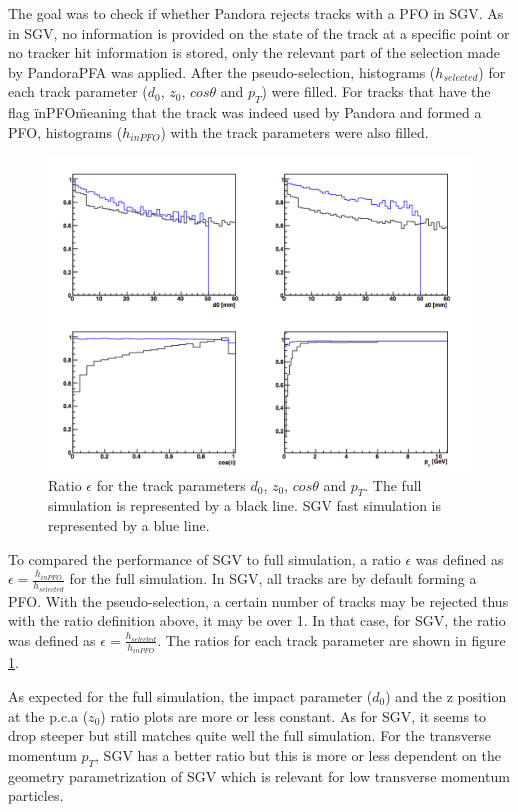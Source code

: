 The goal was to check if whether Pandora rejects tracks with a PFO in SGV. As in SGV, no information is provided on the state of the track at a specific point or no tracker hit information is stored, only the relevant part of the selection made by PandoraPFA was applied. After the pseudo-selection, histograms ($h_{selected}$) for each track parameter ($d_0$, $z_0$, $cos\theta$ and $p_T$) were filled. For tracks that have the flag \"inPFO\" meaning that the track was indeed used by Pandora and formed a PFO, histograms ($h_{inPFO}$) with the track parameters were also filled.

\begin{figure}[htbp!]
  \centering
  \includegraphics[width=1\linewidth]{../Thesis_Plots/SGV/Plots/eff_track_selection_curlers.png}
  \caption{Ratio $\epsilon$ for the track parameters $d_0$, $z_0$, $cos\theta$ and $p_T$. The full simulation is represented by a black line. SGV fast simulation is represented by a blue line.}
  \label{fig:trk_select_wcurlers}
\end{figure}

To compared the performance of SGV to full simulation, a ratio $\epsilon$ was defined as $\epsilon = \frac{h_{inPFO}}{h_{selected}}$ for the full simulation. In SGV, all tracks are by default forming a PFO. With the pseudo-selection, a certain number of tracks may be rejected thus with the ratio definition above, it may be over 1. In that case, for SGV, the ratio was defined as $\epsilon = \frac{h_{selected}}{h_{inPFO}}$. The ratios for each track parameter are shown in figure \ref{fig:trk_select_wcurlers}.

As expected for the full simulation, the impact parameter ($d_0$) and the z position at the p.c.a ($z_0$) ratio plots are more or less constant. As for SGV, it seems to drop steeper but still matches quite well the full simulation. For the transverse momentum $p_{T}$, SGV has a better ratio but this is more or less dependent on the geometry parametrization of SGV which is relevant for low transverse momentum particles.

